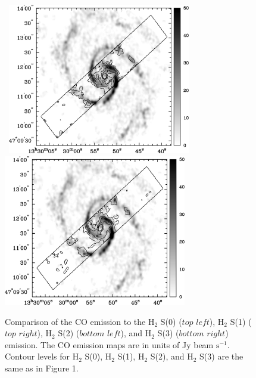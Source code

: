 \documentclass[manuscript]{aastex}
\begin{document}
\begin{figure}[!h]
\centerline{\hbox{\hspace{0.0in}
\includegraphics[width=8cm,angle=0]{bw_co_h2s2.jpg}
\hspace{0.1in}
\includegraphics[width=8cm,angle=0]{bw_co_h2s3.jpg}}}
\caption{Comparison of the CO emission to the $\mathrm{H_2}$ S(0) ($top$ $left$),  $\mathrm{H_2}$ S(1) ($top$ $right$),  $\mathrm{H_2}$ S(2) ($bottom$ $left$),  and $\mathrm{H_2}$ S(3) ($bottom$ $right$) emission.  The CO emission maps are in units of Jy beam $\mathrm{s^{-1}}$.  Contour levels for $\mathrm{H_2}$ S(0), $\mathrm{H_2}$ S(1), $\mathrm{H_2}$ S(2), and $\mathrm{H_2}$ S(3) are the same as in Figure 1.\label{fig8}}
\end{figure}

\clearpage

\end{document}
